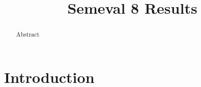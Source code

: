 \documentclass[11pt,letterpaper]{article}
\title{Semeval 8 Results}
\author{}
\date{}
\begin{document}
\maketitle
\begin{abstract}
  Abstract
\end{abstract}

\section{Introduction}
\end{document}
